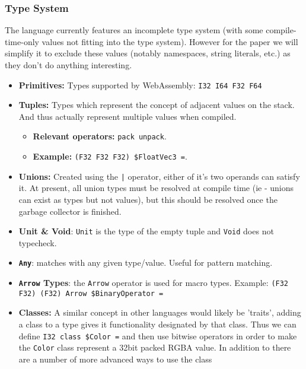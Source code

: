 \documentclass{article}
\begin{document}
    
\subsubsection{Type System}
The language currently features an incomplete type system (with some compile-time-only values not fitting into the type system). However for the paper we will simplify it to exclude these values (notably namespaces, string literals, etc.) as they don't do anything interesting.

\begin{itemize}
    \item \textbf{Primitives:} Types supported by WebAssembly: \texttt{I32 I64 F32 F64}
    \item \textbf{Tuples:} Types which represent the concept of adjacent values on the stack. And thus actually represent multiple values when compiled.
    \begin{itemize}
        \item \textbf{Relevant operators:} \texttt{pack unpack}.
        \item \textbf{Example:} \texttt{(F32 F32 F32) \$FloatVec3 =}.
    \end{itemize}

    \item \textbf{Unions:} Created using the \texttt{|} operator, either of it's two operands can satisfy it. At present, all union types must be resolved at compile time (ie - unions can exist as types but not values), but this should be resolved once the garbage collector is finished.

    \item \textbf{Unit \& Void}: \texttt{Unit} is the type of the empty tuple and \texttt{Void} does not typecheck.

    \item \textbf{\texttt{Any}}: matches with any given type/value. Useful for pattern matching.

    \item \textbf{\texttt{Arrow} Types}: the \texttt{Arrow} operator is used for macro types. 
    Example: \texttt{(F32 F32) (F32) Arrow \$BinaryOperator =}

    \item \textbf{Classes:} A similar concept in other languages would likely be 'traits', adding a class to a type gives it functionality designated by that class. Thus we can define \texttt{I32 class \$Color =} and then use bitwise operators in order to make the \texttt{Color} class represent a 32bit packed RGBA value. In addition to there are a number of more advanced ways to use the class


\end{itemize}
\end{document}
